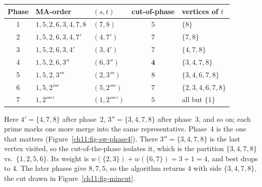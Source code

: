 \begin{center}
\begin{tabular}{cllcl}
\toprule
Phase & MA-order & $(s,t)$ & cut-of-phase & vertices of $t$ \\
\midrule
1 & $1,5,2,6,3,4,7,8$       & $(7,8)$   & $5$          & $\{8\}$ \\
2 & $1,5,2,6,3,4,7'$        & $(4,7')$  & $7$          & $\{7,8\}$ \\
3 & $1,5,2,6,3,4'$          & $(3,4')$  & $7$          & $\{4,7,8\}$ \\
4 & $1,5,2,6,3''$           & $(6,3'')$ & $\mathbf{4}$ & $\{3,4,7,8\}$ \\
5 & $1,5,2,3'''$            & $(2,3''')$& $8$          & $\{3,4,6,7,8\}$ \\
6 & $1,5,2''''$             & $(5,2'''')$& $7$         & $\{2,3,4,6,7,8\}$ \\
7 & $1,2'''''$              & $(1,2''''')$& $5$        & all but $\{1\}$ \\
\bottomrule
\end{tabular}
\end{center}

Here $4'=\{4,7,8\}$ after phase~2, $3''=\{3,4,7,8\}$ after phase~3, and so on; each prime marks one more merge into the same representative. Phase~4 is the one that matters (Figure~\ref{ch11:fig-sw-phase4}). There $3''=\{3,4,7,8\}$ is the last vertex visited, so the cut-of-the-phase isolates it, which is the partition $\{3,4,7,8\}$ vs.\ $\{1,2,5,6\}$. Its weight is $w(\{2,3\})+w(\{6,7\})=3+1=4$, and best drops to $4$. The later phases give $8,7,5$, so the algorithm returns $4$ with side $\{3,4,7,8\}$, the cut drawn in Figure~\ref{ch11:fig-mincut}.

